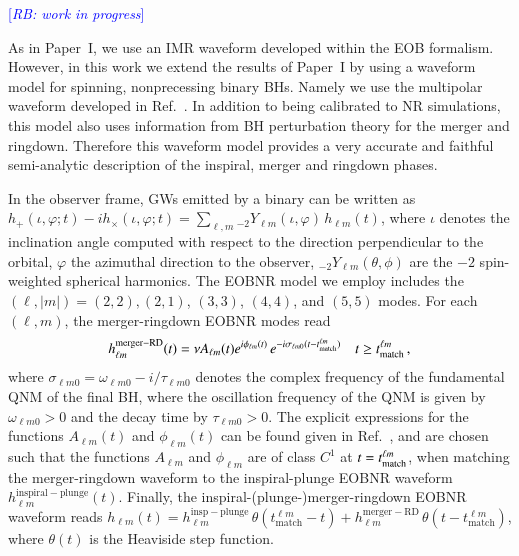 \documentclass[twocolumn,prd,superscriptaddress,amsfonts,amssymb,amsmath,preprintnumbers]{revtex4-1}
\newcommand{\paperone}{Paper~I\xspace}
\newcommand{\rb}[1]{\textcolor{blue}{[\textit{RB: #1}]}}
\begin{document}
\rb{work in progress}

As in \paperone, we use an IMR waveform developed within the EOB formalism. However, in this work we  extend the results of \paperone by using a waveform model for spinning, nonprecessing binary BHs. Namely we use the multipolar waveform developed in Ref.~\citep{Cotesta:2018fcv}. In addition to being calibrated to NR simulations, this model also uses information from BH perturbation theory for the merger and ringdown. Therefore this waveform model provides a very accurate and faithful semi-analytic description of the inspiral, merger and ringdown phases. 


In the observer frame, GWs emitted by a binary can be written as 
$h_+(\iota,\varphi;t ) - i h_\times(\iota,\varphi;t) = \sum_{\ell, m} {}_{-\!2}Y_{\ell m}(\iota,\varphi)\, h_{\ell m}(t)$, where $\iota$ denotes the inclination angle computed with respect to the direction perpendicular to the orbital, $\varphi$ the azimuthal direction to the observer, ${}_{-\!2}Y_{\ell m}(\theta,\phi)$ are the $-2$ spin-weighted spherical harmonics. The EOBNR model we employ includes the $(\ell, |m|)=(2,2),(2,1)$, $(3,3)$, $(4,4)$, and $(5,5)$ modes.  For each $(\ell, m)$, the merger-ringdown EOBNR modes read~\citep{Cotesta:2018fcv}
%
\begin{equation}
  \label{RD}
  h_{\ell m}^\mathrm{merger-RD}(t) = \nu A_{\ell m}(t) e^{i\phi_{\ell m} (t)}\,
  e^{-i\sigma_{\ell m0} (t-t_\mathrm{match}^{\ell m})} \quad t \geq t_{\rm match}^{\ell m}\,,
\end{equation}
%
where $\sigma_{\ell m0} = \omega_{\ell m 0} -i/\tau_{\ell m 0}$ denotes the complex frequency of the fundamental QNM of the final BH,  where the oscillation frequency of the QNM is given by $\omega_{\ell m  0}>0$ and the decay time by $\tau_{\ell m 0}>0$. The explicit expressions for the functions $A_{\ell m}(t)$ and $\phi_{\ell m} (t)$ can be found given in Ref.~\citep{Cotesta:2018fcv}, and are chosen such that the functions $A_{\ell  m}$ and $\phi_{\ell  m}$ are of class $C^1$ at $t=  t_{\rm match}^{\ell m}$, when matching the merger-ringdown waveform to the inspiral-plunge EOBNR 
waveform $h_{\ell m}^\mathrm{inspiral-plunge}(t)$. Finally, the inspiral-(plunge-)merger-ringdown EOBNR waveform reads $h_{\ell m}(t) = h_{\ell m}^\mathrm{insp-plunge}\, \theta(t_\mathrm{match}^{\ell m} - t) + h_{\ell m}^\mathrm{merger-RD}\,\theta(t-t_\mathrm{
    match}^{\ell m})$, where $\theta(t)$ is the Heaviside step function.
 
\end{document}
